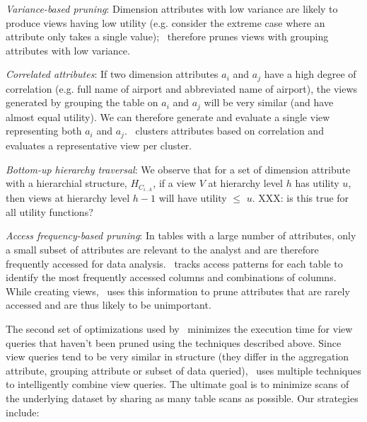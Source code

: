 \begin{denselist}
\item {\it Variance-based pruning}: Dimension attributes with low variance are
likely to produce views having low utility (e.g. consider the extreme case where
an attribute only takes a single value); \SeeDB\ therefore prunes views
with grouping attributes with low variance.
\item {\it Correlated attributes}: If two dimension attributes $a_i$ and $a_j$ have
a high degree of correlation (e.g. full name of airport and abbreviated name of
airport), the views generated by grouping the table on $a_i$ and $a_j$ will be
very similar (and have almost equal utility). We can therefore generate and
evaluate a single view representing both $a_i$ and $a_j$. \SeeDB\ clusters
attributes based on correlation and evaluates a representative view per
cluster.
\item {\it Bottom-up hierarchy traversal}: 
We observe that for a set of
  dimension attribute with a hierarchial structure, $H_{C_{i\ldots k}}$, if a
  view $V$ at hierarchy level $h$ has utility $u$, then views at hierarchy level
  $h-1$ will have utility $\leq$ $u$. XXX: is this true for all utility
  functions?
\item {\it Access frequency-based pruning}: In tables with a large number of
attributes, only a small subset of attributes are relevant to the analyst and
are therefore frequently accessed for data analysis. \SeeDB\ tracks access patterns
for each table to identify the most frequently accessed columns and combinations of
columns. While creating views, \SeeDB\ uses this information to prune attributes
that are rarely accessed and are thus likely to be unimportant.
\end{denselist}

The second set of optimizations used by \SeeDB\ minimizes the execution time for
view queries that haven't been pruned using the techniques described above.
Since view queries tend to be very similar in structure (they differ in the aggregation
attribute, grouping attribute or subset of data queried), \SeeDB\ uses multiple
techniques to intelligently combine view queries.
The ultimate goal is to minimize scans of the underlying dataset by sharing as
many table scans as possible. Our strategies include:

